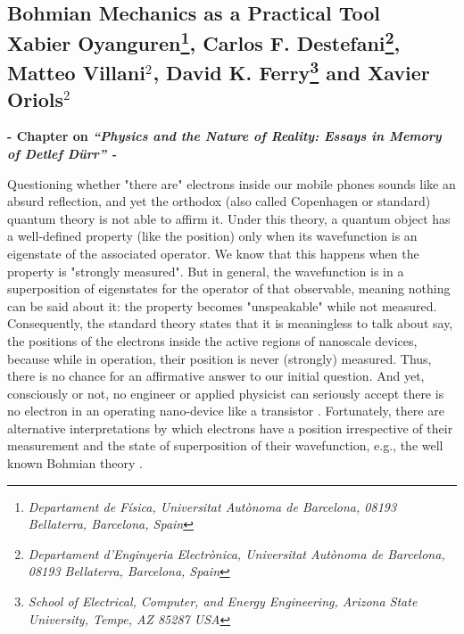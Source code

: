 \documentclass[11pt, a4paper]{article} %
\begin{document}
\newpage
{}
\setcounter{page}{1}
\begin{center}
\section*{ Bohmian Mechanics as a Practical Tool \vspace{0.2cm}\vspace{0.1cm}\\ \small Xabier Oyanguren\footnote{\em Departament de Física, Universitat Autònoma de Barcelona, 08193 Bellaterra, Barcelona, Spain}, Carlos F. Destefani\footnote{\em Departament d’Enginyeria Electrònica, Universitat Autònoma de Barcelona, 08193 Bellaterra, Barcelona, Spain}, Matteo Villani$^2$, David K. Ferry\footnote{\em School of Electrical, Computer, and Energy Engineering, Arizona State University, Tempe,
AZ 85287 USA} and Xavier Oriols$^2$}
\vspace{-0.5cm}
{\bf \small - Chapter on {\em “Physics and the Nature of Reality: Essays in Memory of Detlef Dürr” - }}\vspace{-0.32cm}
\end{center}

\hspace*{4mm} Questioning whether "there are" electrons inside our mobile phones sounds like an absurd reflection, and yet the orthodox (also called Copenhagen or standard) quantum theory is not able to affirm it. Under this theory, a quantum object has a well-defined property (like the position) only when its wavefunction is an eigenstate of the associated operator. We know that this happens when the property is "strongly measured". But in general, the wavefunction is in a superposition of eigenstates for the operator of that observable, meaning nothing can be said about it: the property becomes "unspeakable" while not measured. Consequently, the standard theory states that it is meaningless to talk about say, the positions of the electrons inside the active regions of nanoscale devices, because while in operation, their position is never (strongly) measured. Thus, there is no chance for an affirmative answer to our initial question. And yet, consciously or not, no engineer or applied physicist can seriously accept there is no electron in an operating nano-device like a transistor \cite{where}. Fortunately, there are alternative interpretations by which electrons have a position irrespective of their measurement and the state of superposition of their wavefunction, e.g., the well known Bohmian theory \cite{Bohm,Holland, Durr,JordiXavier}. \vspace{-0.07cm} 
\end{document}
